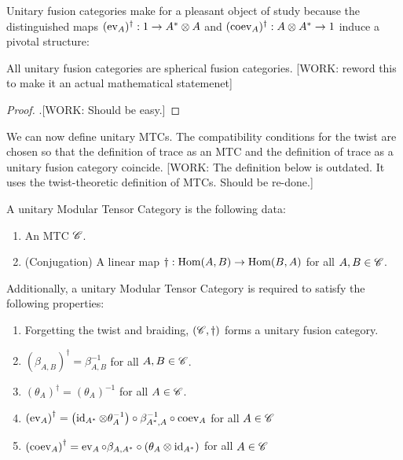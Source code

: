Unitary fusion categories make for a pleasant object of study because the distinguished maps $(\operatorname{ev}_A)^{\dagger}:1\to A^{*}\otimes A$ and $(\operatorname{coev}_A)^{\dagger}:A\otimes A^{*}\to 1$ induce a pivotal structure:

\begin{proposition} All unitary fusion categories are spherical fusion categories. [WORK: reword this to make it an actual mathematical statemenet]
\end{proposition}
\begin{proof}.[WORK: Should be easy.]
\end{proof}

We can now define unitary MTCs. The compatibility conditions for the twist are chosen so that the definition of trace as an MTC and the definition of trace as a unitary fusion category coincide. [WORK: The definition below is outdated. It uses the twist-theoretic definition of MTCs. Should be re-done.]

\begin{definition} A unitary Modular Tensor Category is the following data:

\begin{enumerate}
\item An MTC $\mathscr{C}$.
\item (Conjugation) A linear map $\dagger: \operatorname{Hom}(A,B)\to \operatorname{Hom}(B,A)$ for all $A,B\in \mathscr{C}$.
\end{enumerate}

Additionally, a unitary Modular Tensor Category is required to satisfy the following properties:

\begin{enumerate}
\item Forgetting the twist and braiding, $\left(\mathscr{C},\dagger\right)$ forms a unitary fusion category.
\item $\left(\beta_{A,B}\right)^{\dagger}=\beta_{A,B}^{-1}$ for all $A,B\in \mathscr{C}$.
\item $\left(\theta_A\right)^{\dagger}=\left(\theta_A\right)^{-1}$ for all $A\in \mathscr{C}$.
\item $\left(\operatorname{ev}_{A}\right)^{\dagger}= \left(\operatorname{id}_{A^*}\otimes \theta_A^{-1}\right)\circ \beta_{A^*,A}^{-1}\circ \operatorname{coev}_A$ for all $A\in \mathscr{C}$
\item $\left(\operatorname{coev}_{A}\right)^{\dagger}= \operatorname{ev}_{A}\circ\beta_{A,A^*}\circ\left(\theta_A \otimes \operatorname{id}_{A^*}\right)$ for all $A\in \mathscr{C}$
\end{enumerate}

\raggedleft\qedsymbol{}
\end{definition}

